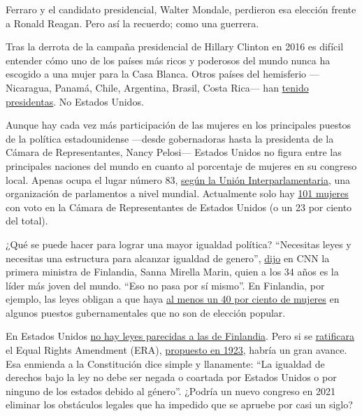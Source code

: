 Ferraro y el candidato presidencial, Walter Mondale, perdieron esa
elección frente a Ronald Reagan. Pero así la recuerdo; como una
guerrera.

Tras la derrota de la campaña presidencial de Hillary Clinton en 2016 es
difícil entender cómo uno de los países más ricos y poderosos del mundo
nunca ha escogido a una mujer para la Casa Blanca. Otros países del
hemisferio ---Nicaragua, Panamá, Chile, Argentina, Brasil, Costa Rica---
han
\href{http://www.teinteresa.es/mundo/anos-mujeres-presidentas-America-Latina_0_1048695520.html}{tenido
presidentas}. No Estados Unidos.

Aunque hay cada vez más participación de las mujeres en los principales
puestos de la política estadounidense ---desde gobernadoras hasta la
presidenta de la Cámara de Representantes, Nancy Pelosi--- Estados
Unidos no figura entre las principales naciones del mundo en cuanto al
porcentaje de mujeres en su congreso local. Apenas ocupa el lugar número
83, \href{https://data.ipu.org/women-ranking?month=6\&year=2020}{según
la Unión Interparlamentaria}, una organización de parlamentos a nivel
mundial. Actualmente solo hay
\href{https://www.cawp.rutgers.edu/women-us-congress-2020}{101 mujeres}
con voto en la Cámara de Representantes de Estados Unidos (o un 23 por
ciento del total).

¿Qué se puede hacer para lograr una mayor igualdad política? ``Necesitas
leyes y necesitas una estructura para alcanzar igualdad de genero'',
\href{https://www.cnn.com/videos/tv/2020/02/07/exp-gps-0209-marin-on-gender-equality-in-usa.cnn}{dijo}
en CNN la primera ministra de Finlandia, Sanna Mirella Marin, quien a
los 34 años es la líder más joven del mundo. ``Eso no pasa por sí
mismo''. En Finlandia, por ejemplo, las leyes obligan a que haya
\href{https://thl.fi/en/web/gender-equality/gender-equality-in-finland/decision-making/gender-quotas}{al
menos un 40 por ciento de mujeres} en algunos puestos gubernamentales
que no son de elección popular.

En Estados Unidos
\href{https://thehill.com/opinion/campaign/465074-why-american-politics-needs-gender-quota}{no
hay leyes parecidas a las de Finlandia}. Pero si se
\href{https://www.britannica.com/topic/Equal-Rights-Amendment}{ratificara}
el Equal Rights Amendment (ERA),
\href{https://thewatchdogonline.com/the-equal-rights-amendment-is-almost-there-29291}{propuesto
en 1923}, habría un gran avance. Esa enmienda a la Constitución dice
simple y llanamente: ``La igualdad de derechos bajo la ley no debe ser
negada o coartada por Estados Unidos o por ninguno de los estados debido
al género''. ¿Podría un nuevo congreso en 2021 eliminar los obstáculos
legales que ha impedido que se apruebe por casi un siglo?

